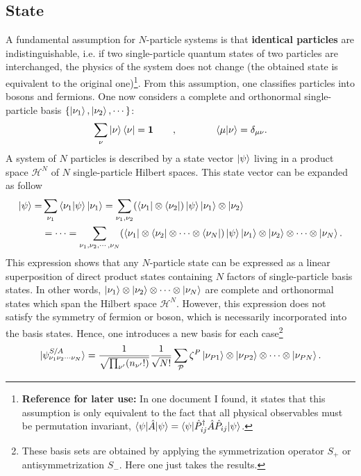 \documentclass[a4paper,12pts]{article}
\numberwithin{equation}{section}
\begin{document}
	\subsection{State}
	A fundamental assumption for $N$-particle systems is that \textbf{identical particles} are indistinguishable, i.e. if two single-particle quantum states of two particles are interchanged, the physics of the system does not change (the obtained state is equivalent to the original one)\footnote{\textbf{Reference for later use:} In one document I found, it states that this assumption is only equivalent to the fact that all physical observables must be permutation invariant, $\braket{\psi|\hat{A}|\psi} = \braket{\psi|\hat{P}_{ij}^{\dagger}\hat{A}\hat{P}_{ij}|\psi}$.}. From this assumption, one classifies particles into bosons and fermions.\bigbreak
	One now considers a complete and orthonormal single-particle basis $\{\ket{\nu_1},\ket{\nu_2},\cdots\}$:
	\begin{equation}
	\sum_{\nu}\ket{\nu}\bra{\nu} = \mathbf{1}\qquad,\qquad\qquad \braket{\mu|\nu} = \delta_{\mu\nu}.
	\end{equation}
	A system of $N$ particles is described by a state vector $\ket{\psi}$ living in a product space $\mathcal{H}^N$ of $N$ single-particle Hilbert spaces. This state vector can be expanded as follow
	\begin{align}
	\ket{\psi} =& \sum_{\nu_1}\braket{\nu_1|\psi}\ket{\nu_1} = \sum_{\nu_1,\nu_2}(\bra{\nu_1}\otimes\bra{\nu_2})\ket{\psi}\ket{\nu_1}\otimes\ket{\nu_2}\nonumber\\
	&= \cdots = \sum_{\nu_1,\nu_2,\cdots,\nu_N}(\bra{\nu_1}\otimes\bra{\nu_2}\otimes\cdots\otimes\bra{\nu_N})\ket{\psi}\ket{\nu_1}\otimes\ket{\nu_2}\otimes\cdots\otimes\ket{\nu_N}.
	\end{align}
	This expression shows that any $N$-particle state can be expressed as a linear superposition of direct product states containing $N$ factors of single-particle basis states. In other words, $\ket{\nu_1}\otimes\ket{\nu_2}\otimes\cdots\otimes\ket{\nu_N}$ are complete and orthonormal states which span the Hilbert space $\mathcal{H}^N$. However, this expression does not satisfy the symmetry of fermion or boson, which is necessarily incorporated into the basis states. Hence, one introduces a new basis for each case\footnote{These basis sets are obtained by applying the symmetrization operator $S_+$ or antisymmetrization $S_-$. Here one just takes the results.}
	\begin{eqnarray}\label{definition}
	\ket{\psi_{\nu_1\nu_2\cdots\nu_N}^{S/A}} = \frac{1}{\sqrt{\prod_{\nu'}(n_{\nu'}!)}}\frac{1}{\sqrt{N!}}\sum_{\mathcal{P}}\zeta^{P}\ket{\nu_{P1}}\otimes\ket{\nu_{P2}}\otimes\cdots\otimes\ket{\nu_{PN}}.
	\end{eqnarray}
\end{document}
